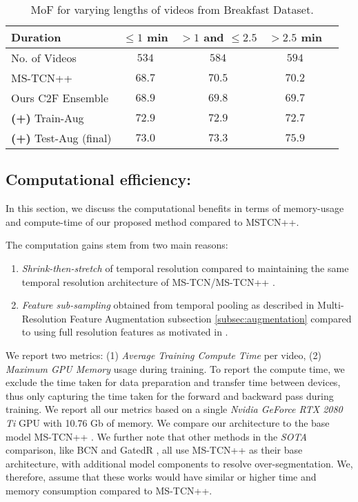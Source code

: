\documentclass[10pt,twocolumn,letterpaper]{article}
\begin{document}
\begin{table}[]
\begin{center}
\small{
\begin{tabular}{|l|c|c|c|c|}
    \hline
    Duration & $\leq\!1$ min & $>\!1$ and $\le\!2.5$ & $>\!2.5$ min \\
    \hline
    No. of Videos & $534$ & $584$ & $594$ \\
    \hline
    MS-TCN++\cite{li2020ms} & $68.7$ & $70.5$ & $70.2$\\
    Ours C2F Ensemble & $68.9$ & $69.8$ & $69.7$ \\
    \textbf{(+)} Train-Aug & $72.9$ & $72.9$ & $72.7$ \\
    \textbf{(+)} Test-Aug (final) & $\mathbf{73.0}$ & $\mathbf{73.3}$ & $\mathbf{75.9}$ \\
    \hline\hline
\end{tabular}
}
\end{center}
\caption{MoF for varying lengths of videos from Breakfast Dataset.}
\label{tab:length_exp}
\end{table}

\subsection{Computational efficiency:}

In this section, we discuss the computational benefits in terms of memory-usage and compute-time of our proposed method compared to MSTCN++\cite{li2020ms}. 

The computation gains stem from two main reasons:
\begin{enumerate}
    \item \textit{Shrink-then-stretch} of temporal resolution compared to maintaining the same temporal resolution architecture of  MS-TCN/MS-TCN++ \cite{farha2019ms,li2020ms}.
    \item \textit{Feature sub-sampling} obtained from temporal pooling as described in Multi-Resolution Feature Augmentation subsection \ref{subsec:augmentation} compared to using full resolution features as motivated in \cite{farha2019ms, li2020ms}.
\end{enumerate}

We report two metrics: (1) \textit{Average Training Compute Time} per video, (2) \textit{Maximum GPU Memory} usage during training. To report the compute time, we exclude the time taken for data preparation and transfer time between devices, thus only capturing the time taken for the forward and backward pass during training. 
We report all our metrics based on a single \textit{Nvidia GeForce RTX 2080 Ti} GPU with 10.76 Gb of memory. We compare our architecture to the base model MS-TCN++ \cite{li2020ms}.  We further note that other methods in the \textit{SOTA} comparison, like BCN \cite{wang2020boundary} and GatedR \cite{wang2020gated}, all use MS-TCN++ as their base architecture, with additional model components to resolve over-segmentation.  We, therefore, assume that these works would have similar or higher time and memory consumption compared to MS-TCN++. 
\end{document}

